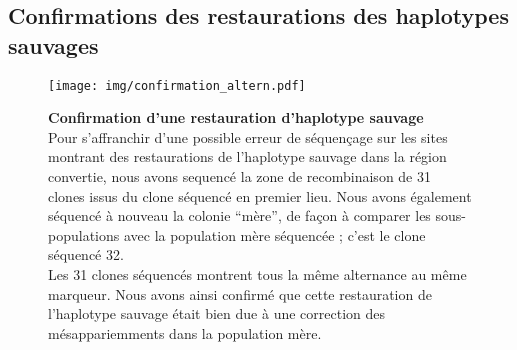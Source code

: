 \subsection{Confirmations des restaurations des haplotypes sauvages}
\label{subsec:confirm-haplotype}

\begin{figure}[ht]
  \centering
  \texttt{[image: img/confirmation\_altern.pdf]}
  \caption[Confirmation des restaurations]{\label{fig:confirm-haplotype}
    \textbf{Confirmation d'une restauration d'haplotype sauvage} \\
    \rmfamily Pour s'affranchir d'une possible erreur de séquençage sur les
    sites montrant des restaurations de l'haplotype sauvage dans la région convertie, nous avons
    sequencé la zone de recombinaison de 31 clones issus du clone séquencé en
    premier lieu. Nous avons également séquencé à nouveau la colonie ``mère'',
    de façon à comparer les sous-populations avec la population mère séquencée ;
    c'est le clone séquencé \num{32}.
    \\
    Les 31 clones séquencés montrent tous la même alternance au même marqueur.
    Nous avons ainsi confirmé que cette restauration de l'haplotype sauvage
    était bien due à une correction des mésappariemments dans la population
    mère.
  }
\end{figure}


